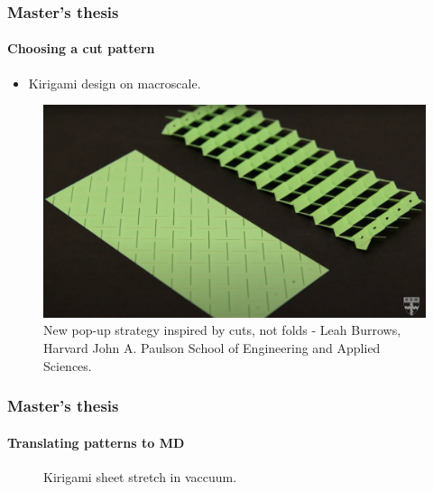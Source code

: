 \documentclass[
	10pt, %
]{beamer}
\begin{document}
\begin{frame}
	\frametitle{Master's thesis}
	\framesubtitle{Choosing a cut pattern}
	\begin{itemize}
		\item Kirigami design on macroscale.
	\end{itemize}
	\begin{figure}
		\includegraphics[width=0.6\linewidth]{figures/kirigami_pattern_inspiration.png}
		\caption{New pop-up strategy inspired by cuts, not folds - Leah Burrows, Harvard John A. Paulson School of Engineering and Applied Sciences.}
	\end{figure}	
\end{frame}



\begin{frame}
	\frametitle{Master's thesis}
	\framesubtitle{Translating patterns to MD}
	\begin{figure}
		\centering    
		\caption{Kirigami sheet stretch in vaccuum.}
   \end{figure} 
\end{frame}
\end{document}
